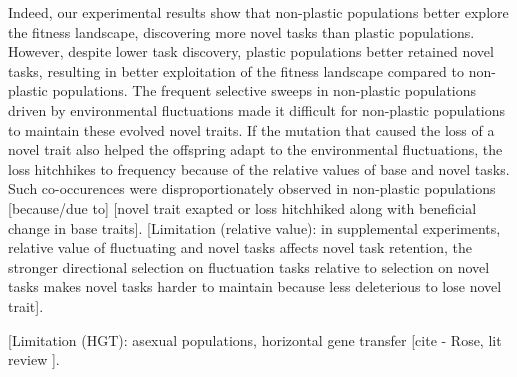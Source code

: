 Indeed, our experimental results show that non-plastic populations better explore the fitness landscape, discovering more novel tasks than plastic populations.
However, despite lower task discovery, plastic populations better retained novel tasks, resulting in better exploitation of the fitness landscape compared to non-plastic populations.
The frequent selective sweeps in non-plastic populations driven by environmental fluctuations made it difficult for non-plastic populations to maintain these evolved novel traits.
If the mutation that caused the loss of a novel trait also helped the offspring adapt to the environmental fluctuations, the loss hitchhikes to frequency because of the relative values of base and novel tasks.
Such co-occurences were disproportionately observed in non-plastic populations [because/due to] [novel trait exapted or loss hitchhiked along with beneficial change in base traits].
[Limitation (relative value): in supplemental experiments, relative value of fluctuating and novel tasks affects novel task retention, the stronger directional selection on fluctuation tasks relative to selection on novel tasks makes novel tasks harder to maintain because less deleterious to lose novel trait].



[Limitation (HGT): asexual populations, horizontal gene transfer [cite - Rose, lit review ].

